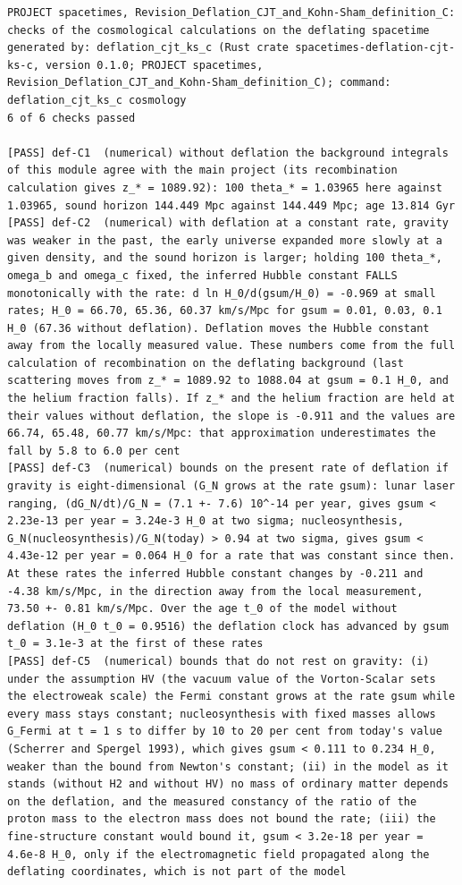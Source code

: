 \documentclass[
  10pt,
]{article}
\begin{document}
\begin{verbatim}
PROJECT spacetimes, Revision_Deflation_CJT_and_Kohn-Sham_definition_C: checks of the cosmological calculations on the deflating spacetime
generated by: deflation_cjt_ks_c (Rust crate spacetimes-deflation-cjt-ks-c, version 0.1.0; PROJECT spacetimes, Revision_Deflation_CJT_and_Kohn-Sham_definition_C); command: deflation_cjt_ks_c cosmology
6 of 6 checks passed

[PASS] def-C1  (numerical) without deflation the background integrals of this module agree with the main project (its recombination calculation gives z_* = 1089.92): 100 theta_* = 1.03965 here against 1.03965, sound horizon 144.449 Mpc against 144.449 Mpc; age 13.814 Gyr
[PASS] def-C2  (numerical) with deflation at a constant rate, gravity was weaker in the past, the early universe expanded more slowly at a given density, and the sound horizon is larger; holding 100 theta_*, omega_b and omega_c fixed, the inferred Hubble constant FALLS monotonically with the rate: d ln H_0/d(gsum/H_0) = -0.969 at small rates; H_0 = 66.70, 65.36, 60.37 km/s/Mpc for gsum = 0.01, 0.03, 0.1 H_0 (67.36 without deflation). Deflation moves the Hubble constant away from the locally measured value. These numbers come from the full calculation of recombination on the deflating background (last scattering moves from z_* = 1089.92 to 1088.04 at gsum = 0.1 H_0, and the helium fraction falls). If z_* and the helium fraction are held at their values without deflation, the slope is -0.911 and the values are 66.74, 65.48, 60.77 km/s/Mpc: that approximation underestimates the fall by 5.8 to 6.0 per cent
[PASS] def-C3  (numerical) bounds on the present rate of deflation if gravity is eight-dimensional (G_N grows at the rate gsum): lunar laser ranging, (dG_N/dt)/G_N = (7.1 +- 7.6) 10^-14 per year, gives gsum < 2.23e-13 per year = 3.24e-3 H_0 at two sigma; nucleosynthesis, G_N(nucleosynthesis)/G_N(today) > 0.94 at two sigma, gives gsum < 4.43e-12 per year = 0.064 H_0 for a rate that was constant since then. At these rates the inferred Hubble constant changes by -0.211 and -4.38 km/s/Mpc, in the direction away from the local measurement, 73.50 +- 0.81 km/s/Mpc. Over the age t_0 of the model without deflation (H_0 t_0 = 0.9516) the deflation clock has advanced by gsum t_0 = 3.1e-3 at the first of these rates
[PASS] def-C5  (numerical) bounds that do not rest on gravity: (i) under the assumption HV (the vacuum value of the Vorton-Scalar sets the electroweak scale) the Fermi constant grows at the rate gsum while every mass stays constant; nucleosynthesis with fixed masses allows G_Fermi at t = 1 s to differ by 10 to 20 per cent from today's value (Scherrer and Spergel 1993), which gives gsum < 0.111 to 0.234 H_0, weaker than the bound from Newton's constant; (ii) in the model as it stands (without H2 and without HV) no mass of ordinary matter depends on the deflation, and the measured constancy of the ratio of the proton mass to the electron mass does not bound the rate; (iii) the fine-structure constant would bound it, gsum < 3.2e-18 per year = 4.6e-8 H_0, only if the electromagnetic field propagated along the deflating coordinates, which is not part of the model

\end{verbatim}
\end{document}
